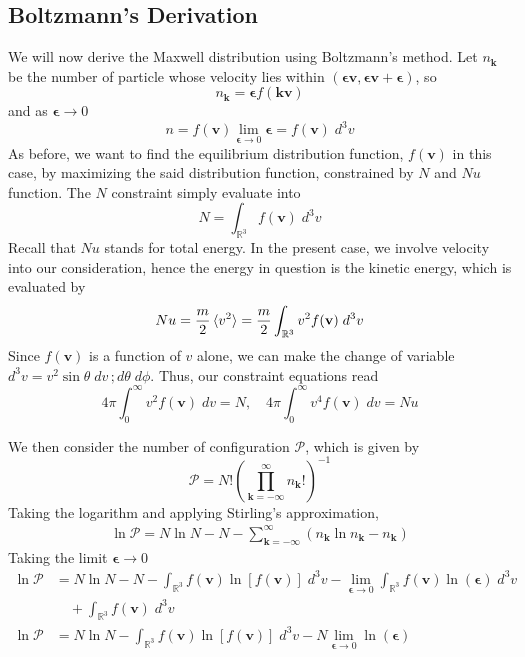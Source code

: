 \documentclass[../../../Main.tex]{subfiles}
\begin{document}
\subsection*{Boltzmann's Derivation}
We will now derive the Maxwell distribution using Boltzmann's method. Let $n_\mathbf{k}$ be the number of particle whose velocity lies within $(\boldsymbol{\epsilon}\mathbf{v},\boldsymbol{\epsilon}\mathbf{v}+\boldsymbol{\epsilon})$, so
\begin{equation*}
    n_\mathbf{k}=\boldsymbol{\epsilon}f(\mathbf{kv})
\end{equation*}
and as $\boldsymbol{\epsilon}\rightarrow0$
\begin{equation*}
    n=f(\mathbf{v})\lim_{\boldsymbol{\epsilon}\rightarrow0}\boldsymbol{\epsilon}=f(\mathbf{v})\;d^3v
\end{equation*}
As before, we want to find the equilibrium distribution function, $f(\mathbf{ v})$ in this case, by maximizing the said distribution function, constrained by $N$ and $Nu$ function. The $N$ constraint simply evaluate into 
\begin{equation*}
    N=\int_{\mathbb{R}^3}  f(\mathbf{v})\;d^3v
\end{equation*}
Recall that $Nu$ stands for total energy. In the present case, we involve velocity into our consideration, hence the energy in question is the kinetic energy, which is evaluated by
\begin{equation*}
    Nu=\frac{m}{2}\braket{v^2}=\frac{m}{2}\int_{\mathbb{R}^3} v^2f(\mathbf{v})\;d^3v
\end{equation*} 
Since $f(\mathbf{v})$ is a function of $v$ alone, we can make the change of variable $d^3v=v^2\sin\theta\;dv\,; d\theta\; d\phi$. Thus, our constraint equations read
\begin{equation*}
    4\pi\int_{0}^{\infty}v^2f(\mathbf{v})\;dv=N, \quad 4\pi \int_{0}^{\infty}v^4f(\mathbf{v})\;dv=Nu
\end{equation*}

We then consider the number of configuration $\mathcal{P}$, which is given by 
\begin{equation*}
    \mathcal{P}=N!\left(\prod_{\mathbf{k}=-\infty}^{\infty}n_\mathbf{k}!\right)^{-1}
\end{equation*}
Taking the logarithm and applying Stirling's approximation,
\begin{align*}
    \ln \mathcal{P}=N\ln N-N-\sum_{\mathbf{k=-\infty}}^{\infty}\left(n_\mathbf{k}\ln n_\mathbf{k}-n_\mathbf{k} \right)
\end{align*}
Taking the limit $\boldsymbol{\epsilon}\rightarrow0$
\begin{align*}
    \ln \mathcal{P}&=N\ln N-N - \int_{\mathbb{R}^3}f(\mathbf{v})\ln [f(\mathbf{v})]\;d^3v - \lim_{\boldsymbol{\epsilon}\rightarrow0} \int_{\mathbb{R}^3}f(\mathbf{v})\ln (\boldsymbol{\epsilon})\;d^3v\\
    &\quad+\int_{\mathbb{R}^3}f(\mathbf{v})\;d^3v\\
    \ln \mathcal{P}&=N\ln N - \int_{\mathbb{R}^3}f(\mathbf{v})\ln [f(\mathbf{v})]\;d^3v -N\lim_{\boldsymbol{\epsilon}\rightarrow0}\ln (\boldsymbol{\epsilon})
\end{align*}
\end{document}

